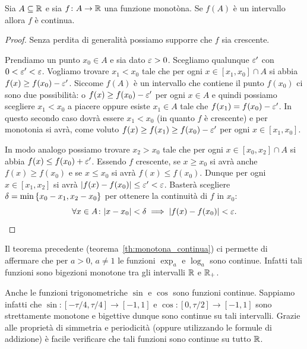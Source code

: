   
\begin{theorem}
    \label{th:monotona_continua}%
    \mymark{*}%
    Sia $A\subseteq {\mathbb R}$ e sia
    $f\colon A \to {\mathbb R}$ una funzione monotòna.
    Se $f(A)$ è un intervallo allora $f$ è continua.
\end{theorem}
  \begin{proof}
  Senza perdita di generalità possiamo supporre che $f$ 
  sia crescente. 
  
  Prendiamo un punto $x_0\in A$ e sia dato $\varepsilon>0$.
  Scegliamo qualunque $\varepsilon'$ con $0<\varepsilon'<\varepsilon$.
  Vogliamo trovare $x_1<x_0$ tale che  
  per ogni $x\in [x_1,x_0]\cap A$ si abbia $f(x)\ge f(x_0)-\varepsilon'$.
  Siccome $f(A)$ è un intervallo che contiene il punto $f(x_0)$ 
  ci sono due possibilità: o $f(x)\ge f(x_0)-\varepsilon'$ per ogni $x\in A$
  e quindi possiamo scegliere $x_1<x_0$ a piacere
  oppure esiste $x_1\in A$ tale che $f(x_1)=f(x_0) - \varepsilon'$.
  In questo secondo caso dovrà essere $x_1<x_0$ (in quanto $f$ è crescente)
  e per monotonia si avrà, come voluto $f(x)\ge f(x_1) \ge f(x_0)-\varepsilon'$ 
  per ogni $x\in [x_1,x_0]$.
  
  In modo analogo possiamo trovare $x_2>x_0$ tale 
  che per ogni $x\in [x_0,x_2]\cap A$ si abbia $f(x) \le f(x_0)+\varepsilon'$.
  Essendo $f$ crescente, se $x\ge x_0$ si avrà anche $f(x)\ge f(x_0)$ 
  e se $x\le x_0$ si avrà $f(x) \le f(x_0)$. 
  Dunque per ogni $x\in [x_1,x_2]$ si avrà ${\left|f(x)-f(x_0)\right|}\le\varepsilon'<\varepsilon$.
  Basterà scegliere $\delta = \min{\left\{ x_0-x_1,x_2-x_0 \right\}}$ 
  per ottenere la continuità di $f$ in $x_0$:
  \[
  \forall x\in A\colon {\left|x-x_0\right|}<\delta \implies {\left|f(x)-f(x_0)\right|}<\varepsilon.
  \]
\end{proof}

Il teorema precedente (teorema~\ref{th:monotona_continua}) 
ci permette di affermare che per $a>0$, $a\neq 1$ 
le funzioni $\exp_a$ e $\log_a$ sono continue. 
Infatti tali funzioni sono bigezioni monotone tra 
gli intervalli ${\mathbb R}$ e ${\mathbb R}_+$.

Anche le funzioni trigonometriche $\sin$ e $\cos$ sono funzioni continue.
Sappiamo infatti che $\sin \colon [-\tau/4,\tau /4]\to [-1,1]$
e $\cos\colon [0,\tau/2]\to [-1,1]$ sono strettamente monotone 
e bigettive dunque sono continue su tali intervalli. 
Grazie alle proprietà di simmetria e periodicità
(oppure utilizzando le formule di addizione) è facile verificare 
che tali funzioni sono continue su tutto ${\mathbb R}$.

